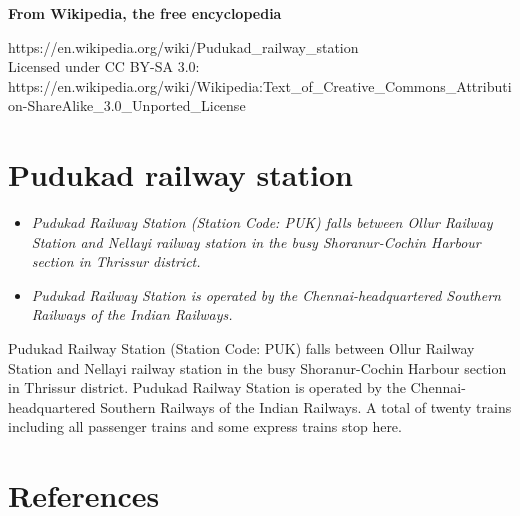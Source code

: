 \textbf{From Wikipedia, the free encyclopedia}

https://en.wikipedia.org/wiki/Pudukad\_railway\_station\\
Licensed under CC BY-SA 3.0:\\
https://en.wikipedia.org/wiki/Wikipedia:Text\_of\_Creative\_Commons\_Attribution-ShareAlike\_3.0\_Unported\_License

\section{Pudukad railway station}\label{pudukad-railway-station}

\begin{itemize}
\item
  \emph{Pudukad Railway Station (Station Code: PUK) falls between Ollur
  Railway Station and Nellayi railway station in the busy
  Shoranur-Cochin Harbour section in Thrissur district.}
\item
  \emph{Pudukad Railway Station is operated by the Chennai-headquartered
  Southern Railways of the Indian Railways.}
\end{itemize}

Pudukad Railway Station (Station Code: PUK) falls between Ollur Railway
Station and Nellayi railway station in the busy Shoranur-Cochin Harbour
section in Thrissur district. Pudukad Railway Station is operated by the
Chennai-headquartered Southern Railways of the Indian Railways. A total
of twenty trains including all passenger trains and some express trains
stop here.

\section{References}\label{references}

